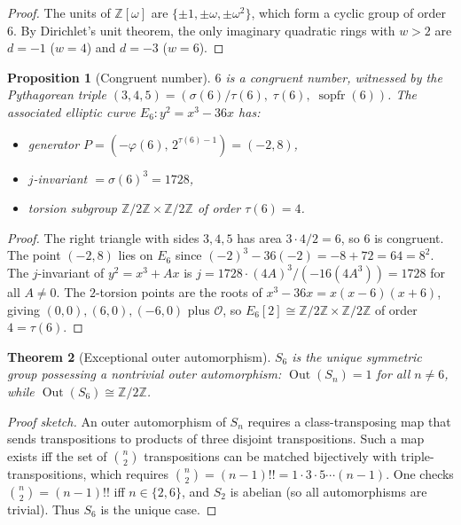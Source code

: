 \documentclass[11pt]{amsart}
\newtheorem{theorem}{Theorem}
\newtheorem{proposition}[theorem]{Proposition}
\theoremstyle{remark}
\begin{document}
\begin{proof}
The units of $\mathbb{Z}[\omega]$ are $\{\pm 1, \pm\omega, \pm\omega^2\}$,
which form a cyclic group of order~$6$.
By Dirichlet's unit theorem, the only imaginary quadratic rings with
$w > 2$ are $d = -1$ ($w = 4$) and $d = -3$ ($w = 6$).
\end{proof}

\begin{proposition}[Congruent number]\label{prop:congruent}
$6$ is a congruent number, witnessed by the Pythagorean triple
$(3, 4, 5) = (\sigma(6)/\tau(6),\; \tau(6),\; \operatorname{sopfr}(6))$.
The associated elliptic curve $E_6\colon y^2 = x^3 - 36x$ has:
\begin{itemize}
\item generator $P = (-\varphi(6),\, 2^{\tau(6)-1}) = (-2, 8)$,
\item $j$-invariant $= \sigma(6)^3 = 1728$,
\item torsion subgroup $\mathbb{Z}/2\mathbb{Z} \times \mathbb{Z}/2\mathbb{Z}$
  of order $\tau(6) = 4$.
\end{itemize}
\end{proposition}

\begin{proof}
The right triangle with sides $3, 4, 5$ has area
$3 \cdot 4/2 = 6$, so $6$ is congruent.
The point $(-2, 8)$ lies on $E_6$ since $(-2)^3 - 36(-2) = -8 + 72 = 64 = 8^2$.
The $j$-invariant of $y^2 = x^3 + Ax$ is $j = 1728 \cdot (4A)^3/(-16(4A^3)) = 1728$
for all $A \neq 0$.
The $2$-torsion points are the roots of $x^3 - 36x = x(x-6)(x+6)$,
giving $(0,0), (6,0), (-6,0)$ plus $\mathcal{O}$,
so $E_6[2] \cong \mathbb{Z}/2\mathbb{Z} \times \mathbb{Z}/2\mathbb{Z}$
of order~$4 = \tau(6)$.
\end{proof}

\begin{theorem}[Exceptional outer automorphism]\label{thm:outer-aut}
$S_6$ is the unique symmetric group possessing a nontrivial outer
automorphism: $\operatorname{Out}(S_n) = 1$ for all $n \neq 6$,
while $\operatorname{Out}(S_6) \cong \mathbb{Z}/2\mathbb{Z}$.
\end{theorem}

\begin{proof}[Proof sketch]
An outer automorphism of $S_n$ requires a class-transposing map
that sends transpositions to products of three disjoint transpositions.
Such a map exists iff the set of $\binom{n}{2}$ transpositions can be
matched bijectively with triple-transpositions, which requires
$\binom{n}{2} = (n-1)!! = 1 \cdot 3 \cdot 5 \cdots (n-1)$.
One checks $\binom{n}{2} = (n-1)!!$ iff $n \in \{2, 6\}$,
and $S_2$ is abelian (so all automorphisms are trivial).
Thus $S_6$ is the unique case.
\end{proof}
\end{document}
